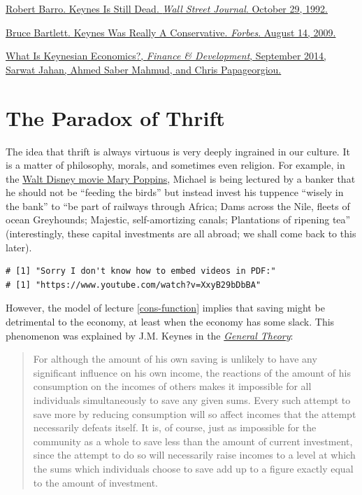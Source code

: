 \documentclass[]{book}
\begin{document}
\href{https://search.proquest.com/docview/398378701/fulltext/CBD1D9A468D04A85PQ/4?accountid=14512}{Robert
Barro. Keynes Is Still Dead. \emph{Wall Street Journal}. October 29,
1992.}

\href{https://www.forbes.com/2009/08/13/john-maynard-keynes-conservative-opinions-columnists-bruce-bartlett.html}{Bruce
Bartlett. Keynes Was Really A Conservative. \emph{Forbes}. August 14,
2009.}

\href{http://www.imf.org/external/pubs/ft/fandd/2014/09/pdf/basics.pdf}{What
Is Keynesian Economics?, \emph{Finance \& Development}, September 2014,
Sarwat Jahan, Ahmed Saber Mahmud, and Chris Papageorgiou.}

\chapter{The Paradox of Thrift}\label{paradox-thrift}

The idea that thrift is always virtuous is very deeply ingrained in our
culture. It is a matter of philosophy, morals, and sometimes even
religion. For example, in the
\href{https://www.youtube.com/watch?v=XxyB29bDbBA}{Walt Disney movie
Mary Poppins}, Michael is being lectured by a banker that he should not
be ``feeding the birds'' but instead invest his tuppence ``wisely in the
bank'' to ``be part of railways through Africa; Dams across the Nile,
fleets of ocean Greyhounds; Majestic, self-amortizing canals;
Plantations of ripening tea'' (interestingly, these capital investments
are all abroad; we shall come back to this later).

\begin{verbatim}
# [1] "Sorry I don't know how to embed videos in PDF:"
# [1] "https://www.youtube.com/watch?v=XxyB29bDbBA"
\end{verbatim}

However, the model of lecture \ref{cons-function} implies that saving
might be detrimental to the economy, at least when the economy has some
slack. This phenomenon was explained by J.M. Keynes in the
\href{http://cas2.umkc.edu/economics/people/facultypages/kregel/courses/econ645/winter2011/generaltheory.pdf}{\emph{General
Theory}}:

\begin{quote}
For although the amount of his own saving is unlikely to have any
significant influence on his own income, the reactions of the amount of
his consumption on the incomes of others makes it impossible for all
individuals simultaneously to save any given sums. Every such attempt to
save more by reducing consumption will so affect incomes that the
attempt necessarily defeats itself. It is, of course, just as impossible
for the community as a whole to save less than the amount of current
investment, since the attempt to do so will necessarily raise incomes to
a level at which the sums which individuals choose to save add up to a
figure exactly equal to the amount of investment.
\end{quote}
\end{document}
